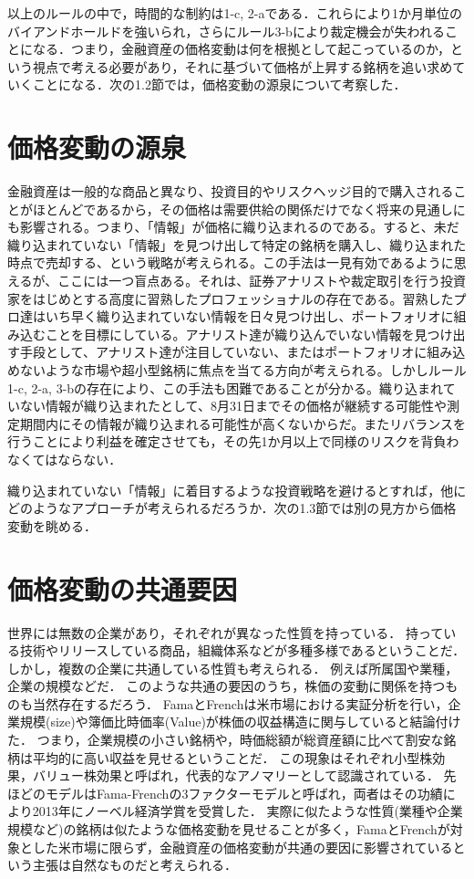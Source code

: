 \documentclass[11pt]{jreport}
\begin{document}
以上のルールの中で，時間的な制約は1-c, 2-aである．これらにより1か月単位のバイアンドホールドを強いられ，さらにルール3-bにより裁定機会が失われることになる．つまり，金融資産の価格変動は何を根拠として起こっているのか，という視点で考える必要があり，それに基づいて価格が上昇する銘柄を追い求めていくことになる．次の1.2節では，価格変動の源泉について考察した．

\section{価格変動の源泉}
金融資産は一般的な商品と異なり、投資目的やリスクヘッジ目的で購入されることがほとんどであるから，その価格は需要供給の関係だけでなく将来の見通しにも影響される。つまり、「情報」が価格に織り込まれるのである。すると、未だ織り込まれていない「情報」を見つけ出して特定の銘柄を購入し、織り込まれた時点で売却する、という戦略が考えられる。この手法は一見有効であるように思えるが、ここには一つ盲点ある。それは、証券アナリストや裁定取引を行う投資家をはじめとする高度に習熟したプロフェッショナルの存在である。習熟したプロ達はいち早く織り込まれていない情報を日々見つけ出し、ポートフォリオに組み込むことを目標にしている。アナリスト達が織り込んでいない情報を見つけ出す手段として、アナリスト達が注目していない、またはポートフォリオに組み込めないような市場や超小型銘柄に焦点を当てる方向が考えられる。しかしルール1-c, 2-a, 3-bの存在により、この手法も困難であることが分かる。織り込まれていない情報が織り込まれたとして、8月31日までその価格が継続する可能性や測定期間内にその情報が織り込まれる可能性が高くないからだ。またリバランスを行うことにより利益を確定させても，その先1か月以上で同様のリスクを背負わなくてはならない．

織り込まれていない「情報」に着目するような投資戦略を避けるとすれば，他にどのようなアプローチが考えられるだろうか．次の1.3節では別の見方から価格変動を眺める．
　
\section{価格変動の共通要因}
世界には無数の企業があり，それぞれが異なった性質を持っている．
持っている技術やリリースしている商品，組織体系などが多種多様であるということだ．
しかし，複数の企業に共通している性質も考えられる．
例えば所属国や業種，企業の規模などだ．
このような共通の要因のうち，株価の変動に関係を持つものも当然存在するだろう．
FamaとFrenchは米市場における実証分析を行い，企業規模(size)や簿価比時価率(Value)が株価の収益構造に関与していると結論付けた．
つまり，企業規模の小さい銘柄や，時価総額が総資産額に比べて割安な銘柄は平均的に高い収益を見せるということだ．
この現象はそれぞれ小型株効果，バリュー株効果と呼ばれ，代表的なアノマリーとして認識されている．
先ほどのモデルはFama-Frenchの3ファクターモデルと呼ばれ，両者はその功績により2013年にノーベル経済学賞を受賞した．
実際に似たような性質(業種や企業規模など)の銘柄は似たような価格変動を見せることが多く，FamaとFrenchが対象とした米市場に限らず，金融資産の価格変動が共通の要因に影響されているという主張は自然なものだと考えられる．
\end{document}
